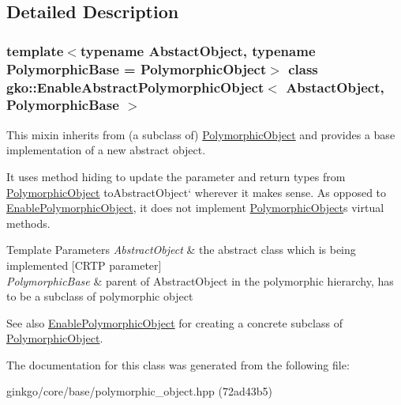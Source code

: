 \subsection{Detailed Description}
\subsubsection*{template$<$typename Abstact\+Object, typename Polymorphic\+Base = Polymorphic\+Object$>$\newline
class gko\+::\+Enable\+Abstract\+Polymorphic\+Object$<$ Abstact\+Object, Polymorphic\+Base $>$}

This mixin inherits from (a subclass of) \hyperlink{classgko_1_1PolymorphicObject}{Polymorphic\+Object} and provides a base implementation of a new abstract object. 

It uses method hiding to update the parameter and return types from {\ttfamily \hyperlink{classgko_1_1PolymorphicObject}{Polymorphic\+Object} to}Abstract\+Object` wherever it makes sense. As opposed to \hyperlink{classgko_1_1EnablePolymorphicObject}{Enable\+Polymorphic\+Object}, it does not implement \hyperlink{classgko_1_1PolymorphicObject}{Polymorphic\+Object}\textquotesingle{}s virtual methods.


\begin{DoxyTemplParams}{Template Parameters}
{\em Abstract\+Object} & the abstract class which is being implemented \mbox{[}C\+R\+TP parameter\mbox{]} \\
\hline
{\em Polymorphic\+Base} & parent of Abstract\+Object in the polymorphic hierarchy, has to be a subclass of polymorphic object\\
\hline
\end{DoxyTemplParams}
\begin{DoxySeeAlso}{See also}
\hyperlink{classgko_1_1EnablePolymorphicObject}{Enable\+Polymorphic\+Object} for creating a concrete subclass of \hyperlink{classgko_1_1PolymorphicObject}{Polymorphic\+Object}. 
\end{DoxySeeAlso}


The documentation for this class was generated from the following file\+:\begin{DoxyCompactItemize}
\item 
ginkgo/core/base/polymorphic\+\_\+object.\+hpp (72ad43b5)\end{DoxyCompactItemize}
